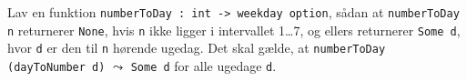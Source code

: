 Lav en funktion \lstinline{numberToDay : int -> weekday option}, sådan at
\lstinline{numberToDay n} returnerer \lstinline{None}, hvis \lstinline!n! ikke
ligger i intervallet 1\ldots7, og ellers returnerer \lstinline{Some d},
hvor \lstinline!d! er den til \lstinline!n! hørende ugedag. Det skal gælde, at
\lstinline{numberToDay (dayToNumber d)} $\leadsto$ \lstinline!Some d! for alle
ugedage \lstinline!d!.